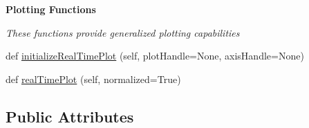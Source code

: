 \begin{Indent}{\bf Plotting Functions}\par
{\em These functions provide generalized plotting capabilities }\begin{DoxyCompactItemize}
\item 
def \hyperlink{classmodest_1_1substates_1_1SubState_1_1SubState_a89c6eb66130203ad0351e94fad3de11d}{initialize\+Real\+Time\+Plot} (self, plot\+Handle=None, axis\+Handle=None)
\item 
def \hyperlink{classmodest_1_1substates_1_1SubState_1_1SubState_a1efb0a32eb2bedc017e4fe190c57976e}{real\+Time\+Plot} (self, normalized=True)
\end{DoxyCompactItemize}
\end{Indent}
\subsection*{Public Attributes}
